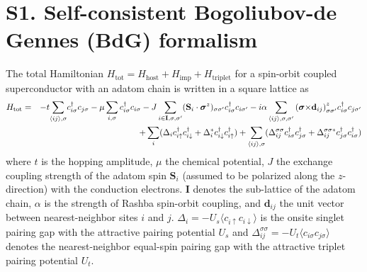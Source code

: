 \documentclass[aps,prl,reprint,nobibnotes]{revtex4-1}
\begin{document}



\section{S1. Self-consistent Bogoliubov-de Gennes (B{d}G) formalism}

The total Hamiltonian $H_{\text{tot}}=H_{\text{host}}+H_{\text{imp}}+H_{\text{triplet}}$ for a spin-orbit coupled superconductor with an adatom chain is written in a square lattice as
\begin{eqnarray}
H_{\text{tot}}&=& -t {\sum_{ \langle ij \rangle ,\sigma}}c_{i{\sigma}}^{\dagger} c_{j{\sigma}} - {\mu} \sum_{i,\sigma}c_{i{\sigma}}^{\dagger} c_{i{\sigma}}  - J\sum_{i\in \mathbf{I},\sigma,{\sigma}'}(\mathbf{S}_i \cdot \boldsymbol{\sigma}^{z})_{\sigma{\sigma}'}c_{i{\sigma}}^{\dagger}c_{i{\sigma}'} 
 -i\alpha \sum_{\langle ij \rangle, \sigma,{\sigma}'} {({\boldsymbol{\sigma}}{{\times}\mathbf{d}_{ij})}^{z}_{{\sigma}{\sigma}'}} c_{i{\sigma}}^{\dagger} c_{j{\sigma}'} \notag\\
&&+ \sum_{i} (\Delta_ic_{i\uparrow}^{\dagger}c_{i\downarrow}^{\dagger} + \Delta_i^{*}c_{i\downarrow}^{\dagger}c_{i\uparrow}^{\dagger}) 
+\sum_{\langle ij \rangle, \sigma} (\Delta_{ij}^{\sigma \sigma} c_{i\sigma}^{\dagger} c_{j\sigma}^{\dagger}+\Delta_{ij}^{\sigma \sigma *} c_{j\sigma}^{\dagger} c_{i\sigma}^{\dagger})
\label{H_supple}
\end{eqnarray}
\noindent where $t$ is the hopping amplitude, $\mu$ the chemical potential, $J$ the exchange coupling strength of the adatom spin $\mathbf{S}_i$ (assumed to be polarized along the $z$-direction) with the conduction electrons. $\mathbf{I}$ denotes the sub-lattice of the adatom chain, $\alpha$ is the strength of Rashba spin-orbit coupling, and $\mathbf{d}_{ij}$ the unit vector between nearest-neighbor sites $i$ and $j$. $\Delta_{i}=-U_s\langle c_{i\uparrow}c_{i\downarrow} \rangle$ is the onsite singlet pairing gap with the attractive pairing potential $U_s$ and $\Delta_{ij}^{\sigma \sigma}=-U_t \langle c_{i\sigma} c_{j\sigma} \rangle$ denotes the nearest-neighbor equal-spin pairing gap with the attractive triplet pairing potential $U_t$.
\end{document}
